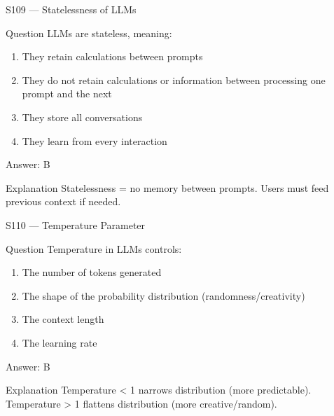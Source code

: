 \documentclass[aspectratio=169,8pt]{beamer}
\begin{document}
	\begin{frame}{S109 --- Statelessness of LLMs}
		\begin{block}{Question}
			LLMs are stateless, meaning:
			\begin{enumerate}
				\item They retain calculations between prompts
				\item They do not retain calculations or information between processing one prompt and the next
				\item They store all conversations
				\item They learn from every interaction
			\end{enumerate}
		\end{block}
		\begin{exampleblock}{Answer: B}\end{exampleblock}
		\begin{block}{Explanation}
			Statelessness = no memory between prompts. Users must feed previous context if needed.
		\end{block}
	\end{frame}
	
	\begin{frame}{S110 --- Temperature Parameter}
		\begin{block}{Question}
			Temperature in LLMs controls:
			\begin{enumerate}
				\item The number of tokens generated
				\item The shape of the probability distribution (randomness/creativity)
				\item The context length
				\item The learning rate
			\end{enumerate}
		\end{block}
		\begin{exampleblock}{Answer: B}\end{exampleblock}
		\begin{block}{Explanation}
			Temperature < 1 narrows distribution (more predictable). Temperature > 1 flattens distribution (more creative/random).
		\end{block}
	\end{frame}
	
\end{document}
